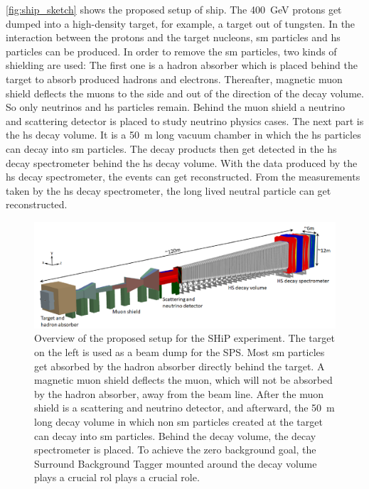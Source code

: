\autoref{fig:ship_sketch} shows the proposed setup of \ac{ship}.
The \SI{400}{\giga\electronvolt} protons get dumped into a high-density target, for example, a target out of tungsten.
In the interaction between the protons and the target nucleons, \ac{sm} particles and \ac{hs} particles can be produced.
In order to remove the \ac{sm} particles, two kinds of shielding are used:
The first one is a hadron absorber which is placed behind the target to absorb produced hadrons and electrons.
Thereafter, magnetic muon shield deflects the muons to the side and out of the direction of the decay volume.
So only neutrinos and \ac{hs} particles remain.
Behind the muon shield a neutrino and scattering detector is placed to study neutrino physics cases.
The next part is the \ac{hs} decay volume.
It is a \SI{50}{\meter} long vacuum chamber in which the \ac{hs} particles can decay into \ac{sm} particles.
The decay products then get detected in the \ac{hs} decay spectrometer behind the \ac{hs} decay volume.
With the data produced by the \ac{hs} decay spectrometer, the events can get reconstructed.
From the measurements taken by the \ac{hs} decay spectrometer, the long lived neutral particle can get reconstructed.
\begin{figure}
	\centering
	\includegraphics[width=1.\textwidth]{pictures/ship_sketch}
	\caption[Overview of the SHiP experiment.]{Overview of the proposed setup for the SHiP experiment. The target on the left is used as a beam dump for the SPS. Most \ac{sm} particles get absorbed by the hadron absorber directly behind the target. A magnetic muon shield deflects the muon, which will not be absorbed by the hadron absorber, away from the beam line. After the muon shield is a scattering and neutrino detector, and afterward, the \SI{50}{\meter} long decay volume in which non \ac{sm} particles created at the target can decay into \ac{sm} particles. Behind the decay volume, the decay spectrometer is placed. To achieve the zero background goal, the Surround Background Tagger mounted around the decay volume plays a crucial rol plays a crucial role. \cite{strucural_design}}
	\label{fig:ship_sketch}
\end{figure}

